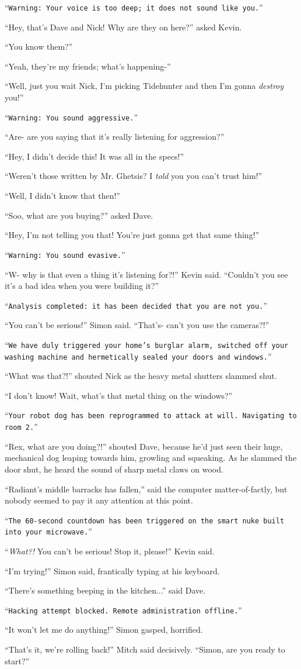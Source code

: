 \documentclass[10pt,a4paper]{article}
\newcommand{\lang}[2]{ #2 \par}
\newcommand{\ai}[2]{
	\lang{
		-- \texttt{#1}
	}{
		``\texttt{#2}''
	}
}
\newcommand{\mainname}{Simon}
\newcommand{\auxname}{Mitch}
\newcommand{\policename}{Mr. Ghetsis}
\newcommand{\criminalname}{Kevin}
\newcommand{\friendAname}{Dave}
\newcommand{\friendBname}{Nick}
\begin{document}
\ai{...}{Warning: Your voice is too deep; it does not sound like you.}
\lang{...}{``Hey, that's \friendAname{} and \friendBname{}! Why are they on here?'' asked \criminalname{}.}
\lang{...}{``You know them?''}
\lang{...}{``Yeah, they're my friends; what's happening-''}
\lang{...}{``Well, just you wait \friendBname{}, I'm picking Tidehunter and then I'm gonna \emph{destroy} you!''}
\ai{...}{Warning: You sound aggressive.}
\lang{...}{``Are- are you saying that it's really listening for aggression?''}
\lang{...}{``Hey, I didn't decide this! It was all in the specs!''}
\lang{...}{``Weren't those written by \policename{}? I \emph{told} you you can't trust him!''}
\lang{...}{``Well, I didn't know that then!''}
\lang{...}{``Soo, what are you buying?'' asked \friendAname{}.}
\lang{...}{``Hey, I'm not telling you that! You're just gonna get that same thing!''}
\ai{...}{Warning: You sound evasive.}
\lang{...}{``W- why is that even a thing it's listening for?!'' \criminalname{} said. ``Couldn't you see it's a bad idea when you were building it?''}
\ai{...}{Analysis completed: it has been decided that you are not you.}
\lang{...}{``You can't be serious!'' \mainname{} said. ``That's- can't you use the cameras?!''}
\ai{...}{We have duly triggered your home's burglar alarm, switched off your washing machine and hermetically sealed your doors and windows.}
\lang{...}{``What was that?!'' shouted \friendBname{} as the heavy metal shutters slammed shut.}
\lang{...}{``I don't know! Wait, what's that metal thing on the windows?''}
\ai{...}{Your robot dog has been reprogrammed to attack at will. Navigating to room 2.}
\lang{...}{``Rex, what are you doing?!'' shouted \friendAname{}, because he'd just seen their huge, mechanical dog leaping towards him, growling and squeaking. As he slammed the door shut, he heard the sound of sharp metal claws on wood.}
\lang{...}{``Radiant's middle barracks has fallen,'' said the computer matter-of-factly, but nobody seemed to pay it any attention at this point.}
\ai{...}{The 60-second countdown has been triggered on the smart nuke built into your microwave.}
\lang{...}{``\emph{What?!} You can't be serious! Stop it, please!'' \criminalname{} said.}
\lang{...}{``I'm trying!'' \mainname{} said, frantically typing at his keyboard.}
\lang{...}{``There's something beeping in the kitchen...'' said \friendAname{}.}
\ai{...}{Hacking attempt blocked. Remote administration offline.}
\lang{...}{``It won't let me do anything!'' \mainname{} gasped, horrified.}
\lang{...}{``That's it, we're rolling back!'' \auxname{} said decisively. ``\mainname{}, are you ready to start?''}
\end{document}

